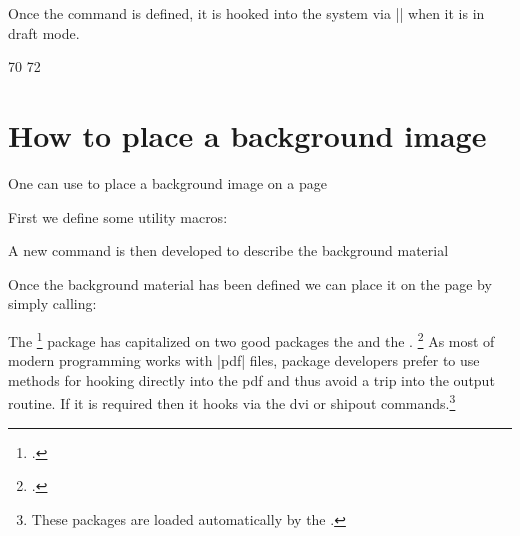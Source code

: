 Once the command is defined, it is hooked into the system via |\EveryShipout| when it is in draft mode. 

\begin{teX}
70  \EveryShipout{\@Prelim@EveryShipout}
72 \fi
\end{teX}

\section{How to place a background image}

One can use \tikzname to place a background image on a page

First we define some utility macros:


\begin{teX}
\def\bg@contents{Draft}
\def\bg@color{red!45}
\def\bg@angle{60}
\def\bg@opacity{.5}
\def\bg@scale{15}
\def\bg@position{current page.center}
\def\bg@anchor{}
\def\bg@hshift{0}
\def\bg@vshift{0}
\end{teX}

A new command is then developed to describe the background material

\begin{teX}
\newcommand\bg@material{%
   \begin{tikzpicture}[remember picture,overlay]
   \node [rotate=\bg@angle,scale=\bg@scale,opacity=\bg@opacity,%
   xshift=\bg@hshift,yshift=\bg@vshift,color=\bg@color]
   at (\bg@position) [\bg@anchor] {\bg@contents};
  \end{tikzpicture}}%
\end{teX}


Once the background material has been defined we can place it on the page by simply calling:

\begin{teX}
\newcommand\BgThispage{\AddThispageHook{\bg@material}}
\end{teX}


The \footcite{background} package has capitalized on two good packages the \tikzname and the .
\footcite{everypage} As most of modern
\tex programming works with |pdf| files, package developers prefer to use \tikzname methods for hooking directly into the pdf and thus avoid a trip into the output routine. If it is required then it hooks via the dvi or shipout commands.\footnote{These packages are loaded automatically by the .}







 







































